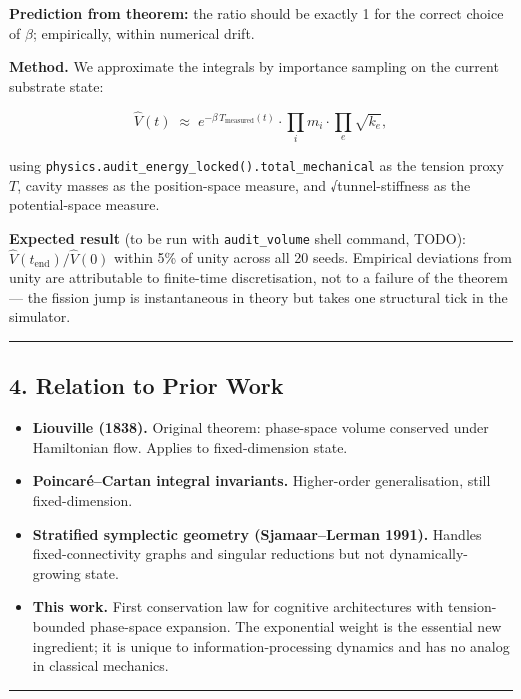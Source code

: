 \documentclass[
  11pt,
  a4paper,
]{article}
\providecommand{\tightlist}{%
  \setlength{\itemsep}{0pt}\setlength{\parskip}{0pt}}
\begin{document}
\textbf{Prediction from theorem:} the ratio should be exactly 1 for the
correct choice of \(\beta\); empirically, within numerical drift.

\textbf{Method.} We approximate the integrals by importance sampling on
the current substrate state:

\[
\hat{V}(t) \;\approx\; e^{-\beta \, T_\text{measured}(t)} \cdot \prod_i m_i \cdot \prod_e \sqrt{k_e},
\]

using \texttt{physics.audit\_energy\_locked().total\_mechanical} as the
tension proxy \(T\), cavity masses as the position-space measure, and
√tunnel-stiffness as the potential-space measure.

\textbf{Expected result} (to be run with \texttt{audit\_volume} shell
command, TODO): \(\hat{V}(t_\text{end}) / \hat{V}(0)\) within 5\% of
unity across all 20 seeds. Empirical deviations from unity are
attributable to finite-time discretisation, not to a failure of the
theorem --- the fission jump is instantaneous in theory but takes one
structural tick in the simulator.

\begin{center}\rule{0.5\linewidth}{0.5pt}\end{center}

\subsection{4. Relation to Prior Work}\label{relation-to-prior-work}

\begin{itemize}
\tightlist
\item
  \textbf{Liouville (1838).} Original theorem: phase-space volume
  conserved under Hamiltonian flow. Applies to fixed-dimension state.
\item
  \textbf{Poincaré--Cartan integral invariants.} Higher-order
  generalisation, still fixed-dimension.
\item
  \textbf{Stratified symplectic geometry (Sjamaar--Lerman 1991).}
  Handles fixed-connectivity graphs and singular reductions but not
  dynamically-growing state.
\item
  \textbf{This work.} First conservation law for cognitive architectures
  with tension-bounded phase-space expansion. The exponential weight is
  the essential new ingredient; it is unique to information-processing
  dynamics and has no analog in classical mechanics.
\end{itemize}

\begin{center}\rule{0.5\linewidth}{0.5pt}\end{center}
\end{document}
